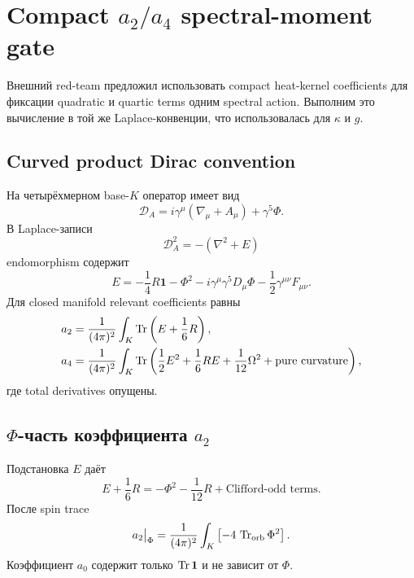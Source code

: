 \chapter{Compact \(a_2/a_4\) spectral-moment gate}

Внешний red-team предложил использовать compact heat-kernel coefficients
для фиксации quadratic и quartic terms одним spectral action. Выполним
это вычисление в той же Laplace-конвенции, что использовалась для
\(\kappa\) и \(g\).

\section{Curved product Dirac convention}

На четырёхмерном base-\(K\) оператор имеет вид
\begin{equation}
 \mathcal D_A
 =
 i\gamma^\mu(\nabla_\mu+A_\mu)
 +\gamma^5\Phi.
\end{equation}
В Laplace-записи
\begin{equation}
 \mathcal D_A^2
 =-(\nabla^2+E)
\end{equation}
endomorphism содержит
\begin{equation}
 E
 =
 -\frac14R\mathbf1
 -\Phi^2
 -i\gamma^\mu\gamma^5D_\mu\Phi
 -\frac12\gamma^{\mu\nu}F_{\mu\nu}.
\end{equation}
Для closed manifold relevant coefficients равны
\begin{align}
 a_2
 &=
 \frac1{(4\pi)^2}
 \int_K
 \operatorname{Tr}\left(E+\frac16R\right),
 \\
 a_4
 &=
 \frac1{(4\pi)^2}
 \int_K
 \operatorname{Tr}\left(
 \frac12E^2
 +\frac16RE
 +\frac1{12}\Omega^2
 +\text{pure curvature}
 \right),
\end{align}
где total derivatives опущены.

\section{\(\Phi\)-часть коэффициента \(a_2\)}

Подстановка \(E\) даёт
\begin{equation}
 E+\frac16R
 =
 -\Phi^2-\frac1{12}R
 +\text{Clifford-odd terms}.
\end{equation}
После spin trace
\begin{equation}
 a_2\big|_{\Phi}
 =
 \frac1{(4\pi)^2}
 \int_K
 \left[
 -4\,\operatorname{Tr}_{\mathrm{orb}}\Phi^2
 \right].
\end{equation}
Коэффициент \(a_0\) содержит только
\(\operatorname{Tr}\mathbf1\) и не зависит от \(\Phi\).

